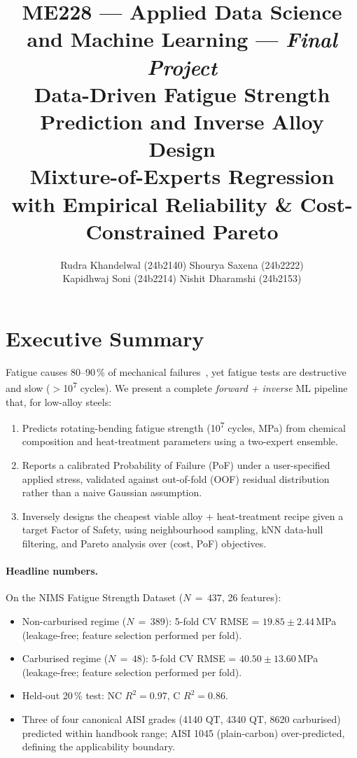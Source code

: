 \documentclass[10pt,a4paper]{article} %
\title{\vspace{-1em}
  \large\textbf{ME228 --- Applied Data Science and Machine Learning} --- \textit{Final Project}\\[3pt]
  \Large\textbf{Data-Driven Fatigue Strength Prediction and Inverse Alloy Design}\\[-2pt]
  \vspace{0.5cm}
  \normalsize Mixture-of-Experts Regression with Empirical Reliability \& Cost-Constrained Pareto
  \vspace{-0.5em}
}
\author{
  Rudra Khandelwal (24b2140) \quad Shourya Saxena (24b2222) \\[2pt]
  Kapidhwaj Soni (24b2214) \quad Nishit Dharamshi (24b2153)
  \vspace{-0.5em}
}
\date{}
\begin{document}
\maketitle

\section{Executive Summary}

Fatigue causes 80--90\,\% of mechanical failures~\cite{agrawal2014}, yet fatigue tests are destructive and slow ($>$10\textsuperscript{7} cycles). We present a complete \emph{forward + inverse} ML pipeline that, for low-alloy steels:

\begin{enumerate}[nosep]
  \item Predicts rotating-bending fatigue strength (10\textsuperscript{7} cycles, MPa) from
        chemical composition and heat-treatment parameters using a two-expert ensemble.
  \item Reports a calibrated Probability of Failure (PoF) under a user-specified applied
        stress, validated against out-of-fold (OOF) residual distribution rather than a naive
        Gaussian assumption.
  \item Inversely designs the cheapest viable alloy + heat-treatment recipe given a target
        Factor of Safety, using neighbourhood sampling, kNN data-hull filtering, and Pareto
        analysis over (cost, PoF) objectives.
\end{enumerate}

\paragraph{Headline numbers.}
On the NIMS Fatigue Strength Dataset ($N\,{=}\,437$, 26 features):
\begin{itemize}[nosep]
  \item Non-carburised regime ($N\,{=}\,389$): 5-fold CV RMSE = $19.85 \pm 2.44$\,MPa
        (leakage-free; feature selection performed per fold).
  \item Carburised regime ($N\,{=}\,48$): 5-fold CV RMSE = $40.50 \pm 13.60$\,MPa
        (leakage-free; feature selection performed per fold).
  \item Held-out 20\,\% test: NC $R^2 = 0.97$, C $R^2 = 0.86$.
  \item Three of four canonical AISI grades (4140 QT, 4340 QT, 8620 carburised) predicted
        within handbook range; AISI 1045 (plain-carbon) over-predicted, defining the
        applicability boundary.
\end{itemize}
\end{document}
